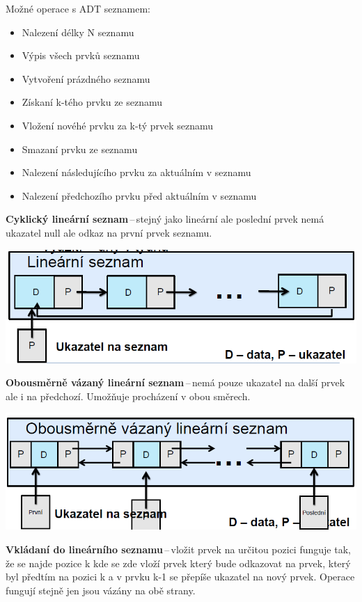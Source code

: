 Možné operace s ADT seznamem:
\begin{itemize}
    \item Nalezení délky N seznamu
    \item Výpis všech prvků seznamu
    \item Vytvoření prázdného seznamu
    \item Získaní k-tého prvku ze seznamu
    \item Vložení novéhé prvku za k-tý prvek seznamu
    \item Smazaní prvku ze seznamu
    \item Nalezení následujícího prvku za aktuálním v seznamu
    \item Nalezení předchozího prvku před aktuálním v seznamu
\end{itemize}

\textbf{Cyklický lineární seznam}\,--\,stejný jako lineární ale poslední prvek nemá ukazatel null ale odkaz na první prvek seznamu.

\begin{center}
\includegraphics[scale=0.5]{BPC-TIN/images/cycsez.PNG}
\end{center}

\textbf{Obousměrně vázaný lineární seznam}\,--\,nemá pouze ukazatel na další prvek ale i na předchozí. Umožňuje procházení v obou směrech.

\begin{center}
\includegraphics[scale=0.5]{BPC-TIN/images/obousez.PNG}
\end{center}

\textbf{Vkládaní do lineárního seznamu}\,--\,vložit prvek na určitou pozici funguje tak, že se najde pozice k kde se zde vloží prvek který bude odkazovat na prvek, který byl předtím na pozici k a v prvku k-1 se přepíše ukazatel na nový prvek. Operace fungují stejně jen jsou vázány na obě strany.

